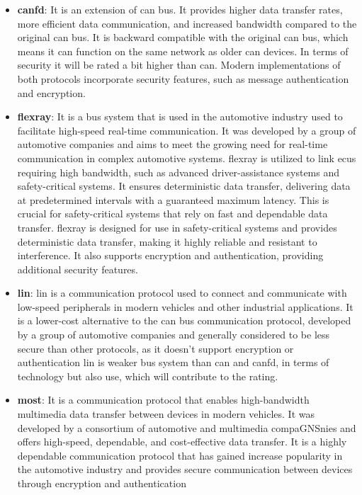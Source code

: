 \begin{itemize}
    \item \textbf{\acrshort{canfd}}: It is an extension of \acrshort{can} bus.
    It provides higher data transfer rates, more efficient data communication, and increased bandwidth compared to the original \acrshort{can} bus.
    It is backward compatible with the original \acrshort{can} bus, which means it can function on the same network as older \acrshort{can} devices.
    In terms of security it will be rated a bit higher than \acrshort{can}.
    Modern implementations of both protocols incorporate security features, such as message authentication and encryption.
    
    \item \textbf{\acrshort{flexray}}: It is a bus system that is used in the automotive industry used to facilitate high-speed real-time communication.
    It was developed by a group of automotive companies and aims to meet the growing need for real-time communication in complex automotive systems.
    \acrshort{flexray} is utilized to link \acrshort{ecu}s requiring high bandwidth, such as advanced driver-assistance systems and safety-critical systems. 
    It ensures deterministic data transfer, delivering data at predetermined intervals with a guaranteed maximum latency. 
    This is crucial for safety-critical systems that rely on fast and dependable data transfer.
    \acrshort{flexray} is designed for use in safety-critical systems and provides deterministic data transfer, making it highly reliable and resistant to interference. 
    It also supports encryption and authentication, providing additional security features.

    \item \textbf{\acrshort{lin}}: \acrshort{lin} is a communication protocol used to connect and communicate with low-speed peripherals in modern vehicles and other industrial applications. 
    It is a lower-cost alternative to the \acrshort{can} bus communication protocol, developed by a group of automotive companies 
    and generally considered to be less secure than other protocols, as it doesn't support encryption or authentication
    \acrshort{lin} is weaker bus system than \acrshort{can} and \acrshort{canfd}, in terms of technology but also use, which will contribute to the rating.
    
    \item \textbf{\acrshort{most}}: It is a communication protocol that enables high-bandwidth multimedia data transfer between devices in modern vehicles. 
    It was developed by a consortium of automotive and multimedia compaGNSnies and offers high-speed, dependable, and cost-effective data transfer.
    It is a highly dependable communication protocol that has gained increase popularity in the automotive industry and
    provides secure communication between devices through encryption and authentication


\end{itemize}
